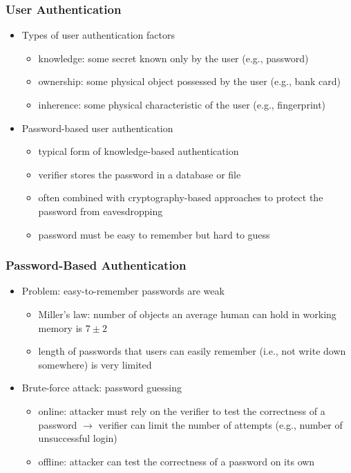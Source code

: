 \documentclass[final]{article}
\begin{document}
\subsubsection*{User Authentication}
\begin{itemize}[nosep]
    \item Types of user authentication factors
          \begin{itemize}[nosep]
              \item knowledge: some secret known only by the user (e.g., password)
              \item ownership: some physical object possessed by the user (e.g., bank card)
              \item inherence: some physical characteristic of the user (e.g., fingerprint)
          \end{itemize}
    \item Password-based user authentication
          \begin{itemize}[nosep]
              \item typical form of knowledge-based authentication
              \item verifier stores the password in a database or file
              \item often combined with cryptography-based approaches to protect the password from eavesdropping
              \item password must be easy to remember but hard to guess
          \end{itemize}
\end{itemize}
\subsubsection*{Password-Based Authentication}
\begin{itemize}
    \item Problem: easy-to-remember passwords are weak
          \begin{itemize}[nosep]
              \item Miller’s law: number of objects an average human can hold in working memory is $7 \pm 2$
              \item length of passwords that users can easily remember (i.e., not write down somewhere) is very limited
          \end{itemize}
    \item Brute-force attack: password guessing
          \begin{itemize}
              \item online: attacker must rely on the verifier to test the correctness of a password $\rightarrow$ verifier can limit the number of attempts (e.g., number of unsuccessful login)
              \item offline: attacker can test the correctness of a password on its own
          \end{itemize}
\end{itemize}
\end{document}
